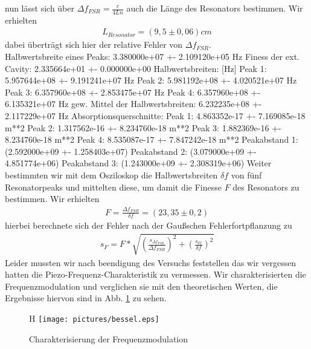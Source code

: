 \documentclass[12pt]{article}
\begin{document}
nun lässt sich über $\Delta f_{FSR} = \frac{c}{4Ln}$ auch die Länge des Resonators bestimmen. Wir erhielten
\begin{align*}
 L_{Resonator}= (9,5 \pm 0,06) cm
\end{align*}
dabei überträgt sich hier der relative Fehler von $\Delta f_{FSR}$.  \\
Halbwertsbreite eines Peaks: 3.380000e+07 +- 2.109120e+05 Hz
Finess der ext. Cavity: 2.335664e+01 +- 0.000000e+00
Halbwertsbreiten: [Hz]
Peak 1: 5.957644e+08 +- 9.191241e+07 Hz
Peak 2: 5.981192e+08 +- 4.020521e+07 Hz
Peak 3: 6.357960e+08 +- 2.853475e+07 Hz
Peak 4: 6.357960e+08 +- 6.135321e+07 Hz
gew. Mittel der Halbwertsbreiten: 6.232235e+08 +- 2.117229e+07 Hz
Absorptionsquerschnitte:
Peak 1: 4.863352e-17 +- 7.169085e-18 m**2
Peak 2: 1.317562e-16 +- 8.234760e-18 m**2
Peak 3: 1.882369e-16 +- 8.234760e-18 m**2
Peak 4: 8.535087e-17 +- 7.847242e-18 m**2
Peakabstand 1: (2.592000e+09 +- 1.258403e+07)
Peakabstand 2: (3.079000e+09 +- 4.851774e+06)
Peakabstand 3: (1.243000e+09 +- 2.308319e+06)
Weiter bestimmten wir mit dem Osziloskop die Halbwertsbreiten $\delta f$ von fünf Resonatorpeaks und mittelten diese, um damit die Finesse $F$ des Resonators zu bestimmen. Wir erhielten 
\begin{align*}
 F = \frac{\Delta f_{FSR}}{\delta f} = ( 23,35 \pm 0,2 )
\end{align*}
hierbei berechnete sich der Fehler nach der Gaußschen Fehlerfortpflanzung zu
\begin{align*}
 s_F = F * \sqrt{ \left( \frac{s_{\Delta f_{FSR}}}{\Delta f_{FSR}} \right)^2 + \left( \frac{s_{\delta f}}{\delta f} \right)^2}
\end{align*}
Leider mussten wir nach beendigung des Versuchs feststellen das wir vergessen hatten die Piezo-Frequenz-Charakteristik zu vermessen. 
Wir charakterisierten die Frequenzmodulation und verglichen sie mit den theoretischen Werten, die Ergebnisse hiervon sind in Abb. \ref{bessel} zu sehen.
\begin{figure}H
 \texttt{[image: pictures/bessel.eps]}
 \caption{Charakterisierung der Frequenzmodulation}
 \label{bessel}
\end{figure}
\end{document}
